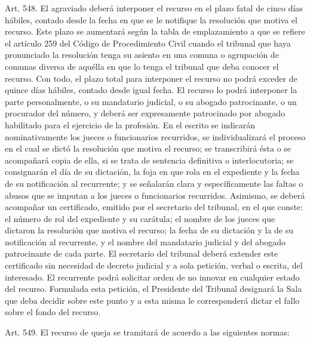     Art. 548. El agraviado deberá interponer el recurso en el plazo fatal de cinco días hábiles, contado desde la fecha en que se le notifique la resolución que motiva el recurso. Este plazo se aumentará según la tabla de emplazamiento a que se refiere el artículo 259 del Código de Procedimiento Civil cuando el tribunal que haya pronunciado la resolución tenga su asiento en una comuna o agrupación de comunas diversa de aquélla en que lo tenga el tribunal que deba conocer el recurso. Con todo, el plazo total para interponer el recurso no podrá exceder de quince días hábiles, contado desde igual fecha.
    El recurso lo podrá interponer la parte personalmente, o su mandatario judicial, o su abogado patrocinante, o un procurador del número, y deberá ser expresamente patrocinado por abogado habilitado para el ejercicio de la profesión.
    En el escrito se indicarán nominativamente los jueces o funcionarios recurridos, se individualizará el proceso en el cual se dictó la resolución que motiva el recurso; se transcribirá ésta o se acompañará copia de ella, si se trata de sentencia definitiva o interlocutoria; se consignarán el día de su dictación, la foja en que rola en el expediente y la fecha de su notificación al recurrente; y se señalarán clara y específicamente las faltas o abusos que se imputan a los jueces o funcionarios recurridos.
    Asimismo, se deberá acompañar un certificado, emitido por el secretario del tribunal, en el que conste: el número de rol del expediente y su carátula; el nombre de los jueces que dictaron la resolución que motiva el recurso; la fecha de su dictación y la de su notificación al recurrente, y el nombre del mandatario judicial y del abogado patrocinante de cada parte. El secretario del tribunal deberá extender este certificado sin necesidad de decreto judicial y a sola petición, verbal o escrita, del interesado.
    El recurrente podrá solicitar orden de no innovar en cualquier estado del recurso. Formulada esta petición, el Presidente del Tribunal designará la Sala que deba decidir sobre este punto y a esta misma le corresponderá dictar el fallo sobre el fondo del recurso.

    Art. 549. El recurso de queja se tramitará de acuerdo a las siguientes normas:

